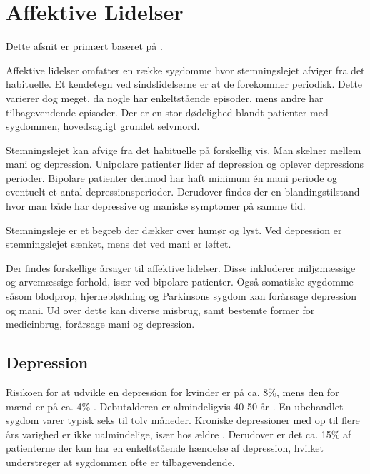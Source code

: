 
\section{Affektive Lidelser}\label{sec:affektivelidelser}
Dette afsnit er primært baseret på \citet{misc:affektivelidelser, misc:netpsykdepression, misc:netpsykmani}.

Affektive lidelser omfatter en række sygdomme hvor stemningslejet afviger fra det habituelle.
Et kendetegn ved sindslidelserne er at de forekommer periodisk.
Dette varierer dog meget, da nogle har enkeltstående episoder, mens andre har tilbagevendende episoder.
Der er en stor dødelighed blandt patienter med sygdommen, hovedsagligt grundet selvmord.

Stemningslejet kan afvige fra det habituelle på forskellig vis.
Man skelner mellem mani og depression.
Unipolare patienter lider af depression og oplever depressions perioder.
Bipolare patienter derimod har haft minimum én mani periode og eventuelt et antal depressionsperioder.
Derudover findes der en blandingstilstand hvor man både har depressive og maniske symptomer på samme tid.


Stemningsleje er et begreb der dækker over humør og lyst.
Ved depression er stemningslejet sænket, mens det ved mani er løftet.

Der findes forskellige årsager til affektive lidelser. 
Disse inkluderer miljømæssige og arvemæssige forhold, især ved bipolare patienter.
Også somatiske sygdomme såsom blodprop, hjerneblødning og Parkinsons sygdom kan forårsage depression og mani.
Ud over dette kan diverse misbrug, samt bestemte former for medicinbrug, forårsage mani og depression.

\subsection{Depression}
Risikoen for at udvikle en depression for kvinder er på ca. 8\%, mens den for mænd er på ca. 4\% \citep{misc:affektivelidelser}.
Debutalderen er almindeligvis 40-50 år \citep{misc:affektivelidelser}.
En ubehandlet sygdom varer typisk seks til tolv måneder.
Kroniske depressioner med op til flere års varighed er ikke ualmindelige, især hos ældre \citep{misc:affektivelidelser}.
Derudover er det ca. 15\% af patienterne der kun har en enkeltstående hændelse af depression, hvilket understreger at sygdommen ofte er tilbagevendende.

